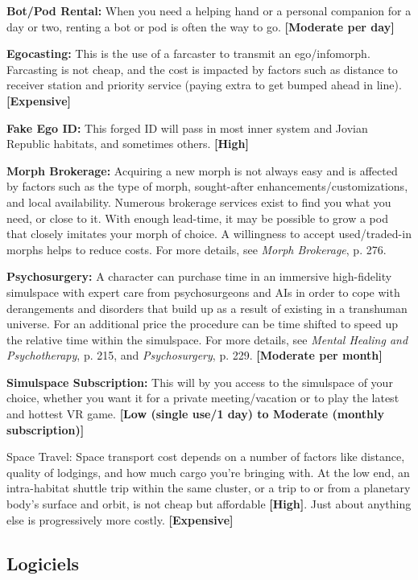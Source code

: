 \textbf{Bot/Pod Rental:} When you need a helping hand or a personal companion for a day or two, renting a bot or pod is often the way to go. \textbf{[Moderate per day]} 

\textbf{Egocasting:} This is the use of a farcaster to transmit an ego/infomorph. Farcasting is not cheap, and the cost is impacted by factors such as distance to receiver station and priority service (paying extra to get bumped ahead in line). \textbf{[Expensive]} 

\textbf{Fake Ego ID:} This forged ID will pass in most inner system and Jovian Republic habitats, and sometimes others. \textbf{[High]} 

\textbf{Morph Brokerage:} Acquiring a new morph is not always easy and is affected by factors such as the type of morph, sought-after enhancements/customizations, and local availability. Numerous brokerage services exist to find you what you need, or close to it. With enough lead-time, it may be possible to grow a pod that closely imitates your morph of choice. A willingness to accept used/traded-in morphs helps to reduce costs. For more details, see \emph{Morph Brokerage}, p. 276. 

\textbf{Psychosurgery:} A character can purchase time in an immersive high-fidelity simulspace with expert care from psychosurgeons and AIs in order to cope with derangements and disorders that build up as a result of existing in a transhuman universe. For an additional price the procedure can be time shifted to speed up the relative time within the simulspace. For more details, see \emph{Mental Healing and Psychotherapy}, p. 215, and \emph{Psychosurgery}, p. 229. \textbf{[Moderate per month]} 

\textbf{Simulspace Subscription:} This will by you access to the simulspace of your choice, whether you want it for a private meeting/vacation or to play the latest and hottest VR game. \textbf{[Low (single use/1 day) to Moderate (monthly subscription)]} 

Space Travel: Space transport cost depends on a number of factors like distance, quality of lodgings, and how much cargo you’re bringing with. At the low end, an intra-habitat shuttle trip within the same cluster, or a trip to or from a planetary body’s surface and orbit, is not cheap but affordable \textbf{[High]}. Just about anything else is progressively more costly. \textbf{[Expensive]} 

\subsection{Logiciels} \label{sec:software} 

